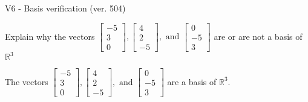 \begin{exercise}
  \begin{exerciseTitle}V6 - Basis verification (ver. 504)\end{exerciseTitle}
  \begin{exerciseStatement}
    Explain why the vectors \(\left[\begin{array}{r}
-5 \\
3 \\
0
\end{array}\right] , \left[\begin{array}{r}
4 \\
2 \\
-5
\end{array}\right] , \text{ and } \left[\begin{array}{r}
0 \\
-5 \\
3
\end{array}\right]\) are or are not a basis of \(\mathbb{R}^3\)	


  \end{exerciseStatement}
  \begin{exerciseAnswer}
   The vectors \(\left[\begin{array}{r}
-5 \\
3 \\
0
\end{array}\right] , \left[\begin{array}{r}
4 \\
2 \\
-5
\end{array}\right] , \text{ and } \left[\begin{array}{r}
0 \\
-5 \\
3
\end{array}\right]\) 
  	 are  a basis of \(\mathbb{R}^3\).
  


  \end{exerciseAnswer}
\end{exercise}